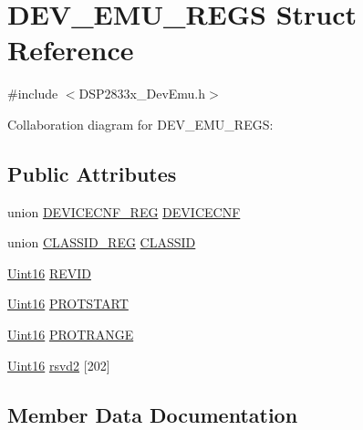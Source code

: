 \hypertarget{struct_d_e_v___e_m_u___r_e_g_s}{}\section{D\+E\+V\+\_\+\+E\+M\+U\+\_\+\+R\+E\+G\+S Struct Reference}
\label{struct_d_e_v___e_m_u___r_e_g_s}


{\ttfamily \#include $<$D\+S\+P2833x\+\_\+\+Dev\+Emu.\+h$>$}



Collaboration diagram for D\+E\+V\+\_\+\+E\+M\+U\+\_\+\+R\+E\+G\+S\+:
\subsection*{Public Attributes}
\begin{DoxyCompactItemize}
\item 
union \hyperlink{union_d_e_v_i_c_e_c_n_f___r_e_g}{D\+E\+V\+I\+C\+E\+C\+N\+F\+\_\+\+R\+E\+G} \hyperlink{struct_d_e_v___e_m_u___r_e_g_s_a1272c5ac872de25b46ab509646cf11cc}{D\+E\+V\+I\+C\+E\+C\+N\+F}
\item 
union \hyperlink{union_c_l_a_s_s_i_d___r_e_g}{C\+L\+A\+S\+S\+I\+D\+\_\+\+R\+E\+G} \hyperlink{struct_d_e_v___e_m_u___r_e_g_s_add72da3c7f106a7e43ca2dfeb6dedaa0}{C\+L\+A\+S\+S\+I\+D}
\item 
\hyperlink{_d_s_p2833x___device_8h_a59a9f6be4562c327cbfb4f7e8e18f08b}{Uint16} \hyperlink{struct_d_e_v___e_m_u___r_e_g_s_ab3b9758bbe253258d9544e41fb43a4a8}{R\+E\+V\+I\+D}
\item 
\hyperlink{_d_s_p2833x___device_8h_a59a9f6be4562c327cbfb4f7e8e18f08b}{Uint16} \hyperlink{struct_d_e_v___e_m_u___r_e_g_s_abe2ed21f7d95d879165f1e919094499b}{P\+R\+O\+T\+S\+T\+A\+R\+T}
\item 
\hyperlink{_d_s_p2833x___device_8h_a59a9f6be4562c327cbfb4f7e8e18f08b}{Uint16} \hyperlink{struct_d_e_v___e_m_u___r_e_g_s_a6ffaacba015a4364a4d3af8fb630d5d8}{P\+R\+O\+T\+R\+A\+N\+G\+E}
\item 
\hyperlink{_d_s_p2833x___device_8h_a59a9f6be4562c327cbfb4f7e8e18f08b}{Uint16} \hyperlink{struct_d_e_v___e_m_u___r_e_g_s_ad16c9b7d67f8bb13f6bfe71fe47fe5f4}{rsvd2} \mbox{[}202\mbox{]}
\end{DoxyCompactItemize}


\subsection{Member Data Documentation}
\hypertarget{struct_d_e_v___e_m_u___r_e_g_s_add72da3c7f106a7e43ca2dfeb6dedaa0}{}
